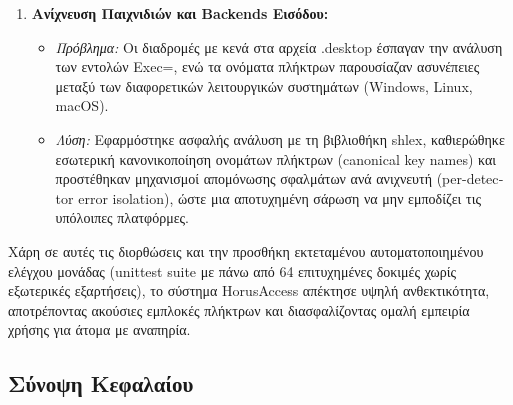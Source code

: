 \documentclass[twoside, a4paper, 11pt]{article}
\newcommand{\textlatin}[1]{\textenglish{#1}}
\begin{document}
\begin{enumerate}
    \item \textbf{Ανίχνευση Παιχνιδιών και Backends Εισόδου:}
    \begin{itemize}
        \item \emph{Πρόβλημα:} Οι διαδρομές με κενά στα αρχεία \textlatin{.desktop} έσπαγαν την ανάλυση των εντολών \textlatin{Exec=}, ενώ τα ονόματα πλήκτρων παρουσίαζαν ασυνέπειες μεταξύ των διαφορετικών λειτουργικών συστημάτων (\textlatin{Windows, Linux, macOS}).
        \item \emph{Λύση:} Εφαρμόστηκε ασφαλής ανάλυση με τη βιβλιοθήκη \textlatin{shlex}, καθιερώθηκε εσωτερική κανονικοποίηση ονομάτων πλήκτρων (\textlatin{canonical key names}) και προστέθηκαν μηχανισμοί απομόνωσης σφαλμάτων ανά ανιχνευτή (\textlatin{per-detector error isolation}), ώστε μια αποτυχημένη σάρωση να μην εμποδίζει τις υπόλοιπες πλατφόρμες.
    \end{itemize}
\end{enumerate}

Χάρη σε αυτές τις διορθώσεις και την προσθήκη εκτεταμένου αυτοματοποιημένου ελέγχου μονάδας (\textlatin{unittest suite} με πάνω από 64 επιτυχημένες δοκιμές χωρίς εξωτερικές εξαρτήσεις), το σύστημα \textlatin{HorusAccess} απέκτησε υψηλή ανθεκτικότητα, αποτρέποντας ακούσιες εμπλοκές πλήκτρων και διασφαλίζοντας ομαλή εμπειρία χρήσης για άτομα με αναπηρία.


\subsection{Σύνοψη Κεφαλαίου}
\end{document}
